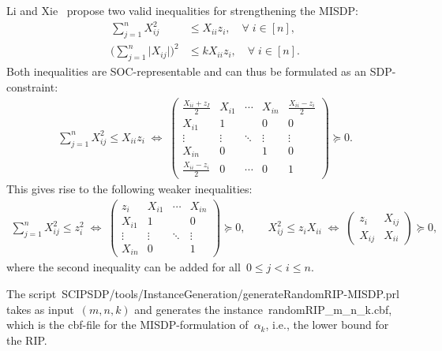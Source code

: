 \documentclass[11pt,a4paper]{article}
\newcommand{\abs}[1]{\lvert{#1}\rvert}
\theoremstyle{definition}
\begin{document}
Li and Xie~\cite{LiX20} propose two valid inequalities for strengthening the MISDP:
\begin{align*}
  \sum_{j=1}^n X_{ij}^2 &\leq X_{ii}z_i,\quad \forall \; i \in [n],\\
  \big(\sum_{j=1}^n \abs{X_{ij}}\big)^2 &\leq kX_{ii}z_i, \quad \forall \;
                                          i \in [n].
\end{align*}
Both inequalities are SOC-representable and can thus be formulated as an SDP-constraint:
\begin{align}\label{eq:ValidSOCPineqSDP}
  \sum_{j=1}^n X_{ij}^2 \leq X_{ii}z_i \; \Leftrightarrow \;
  \begin{pmatrix}
    \tfrac{X_{ii}+z_I}{2} & X_{i1} & \cdots & X_{in} & \tfrac{X_{ii}-z_i}{2}
    \\
    X_{i1} & 1 & & 0 & 0 \\
    \vdots &\vdots & \ddots & \vdots & \vdots \\
    X_{in} & 0 & & 1 & 0 \\
    \tfrac{X_{ii}-z_i}{2} & 0 & \cdots & 0 & 1
  \end{pmatrix} \succeq 0.
\end{align}
This gives rise to the following weaker inequalities:
\begin{align*}
  \sum_{j=1}^n X_{ij}^2 \leq z_i^2 \; \Leftrightarrow \;
  \begin{pmatrix}
    z_i & X_{i1} & \cdots & X_{in} \\
    X_{i1} & 1 & & 0 \\
    \vdots &\vdots & \ddots & \vdots \\
    X_{in} & 0 & & 1
  \end{pmatrix} \succeq 0, \qquad
                   X_{ij}^2 \leq z_iX_{ii}  \; \Leftrightarrow \;
                   \begin{pmatrix}
                     z_i & X_{ij} \\
                     X_{ij} & X_{ii}
                   \end{pmatrix} \succeq 0,
\end{align*}
where the second inequality can be added for all~$0\leq j < i\leq n$.

The
script~\textsf{SCIPSDP/tools/InstanceGeneration/generateRandomRIP-MISDP.prl}
takes as input~$(m,n,k)$ and generates the
instance~\textsf{randomRIP\_m\_n\_k.cbf}, which is the cbf-file for the
MISDP-formulation of~$\alpha_k$, i.e., the lower bound for the RIP.
\end{document}
